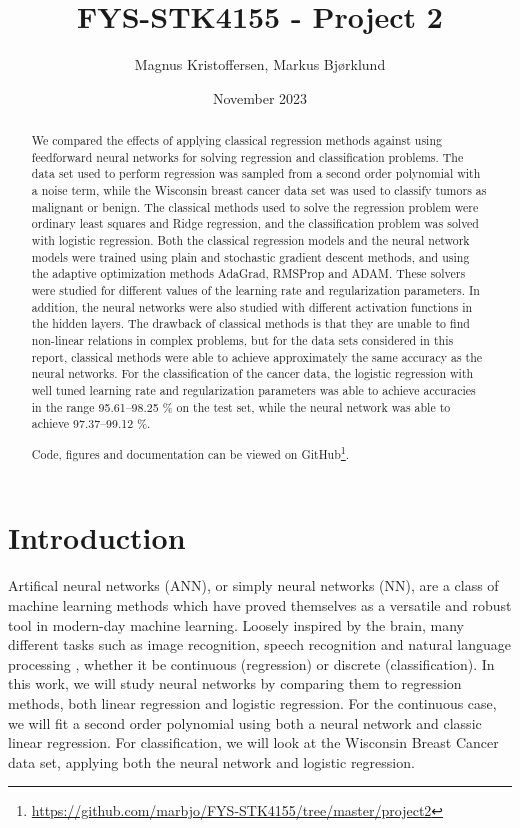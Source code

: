 \documentclass[12pt]{article}
\title{FYS-STK4155 - Project 2}
\author{Magnus Kristoffersen, Markus Bjørklund}
\date{November 2023}
\begin{document}
\maketitle

\begin{abstract}
We compared the effects of applying classical regression methods against using feedforward neural networks for solving regression and classification problems. The data set used to perform regression was sampled from a second order polynomial with a noise term, while the Wisconsin breast cancer data set was used to classify tumors as malignant or benign. The classical methods used to solve the regression problem were ordinary least squares and Ridge regression, and the classification problem was solved with logistic regression. Both the classical regression models and the neural network models were trained using plain and stochastic gradient descent methods, and using the adaptive optimization methods AdaGrad, RMSProp and ADAM. These solvers were studied for different values of the learning rate and regularization parameters. In addition, the neural networks were also studied with different activation functions in the hidden layers. The drawback of classical methods is that they are unable to find non-linear relations in complex problems, but for the data sets considered in this report, classical methods were able to achieve approximately the same accuracy as the neural networks. For the classification of the cancer data, the logistic regression with well tuned learning rate and regularization parameters was able to achieve accuracies in the range \numrange[range-phrase = --]{95.61}{98.25} \% on the test set, while the neural network was able to achieve \numrange[range-phrase = --]{97.37}{99.12} \%.

    
Code, figures and documentation can be viewed on GitHub\footnote{\url{https://github.com/marbjo/FYS-STK4155/tree/master/project2}}.
\end{abstract}

\section{Introduction}
Artifical neural networks (ANN), or simply neural networks (NN), are a class of machine learning methods which have proved themselves as a versatile and robust tool in modern-day machine learning. Loosely inspired by the brain, many different tasks such as image recognition, speech recognition and natural language processing \cite{Nielsen}, whether it be continuous (regression) or discrete (classification).
In this work, we will study neural networks by comparing them to regression methods, both linear regression and logistic regression. For the continuous case, we will fit a second order polynomial using both a neural network and classic linear regression. For classification, we will look at the Wisconsin Breast Cancer data set\cite{breast_cancer_wisconsin}, applying both the neural network and logistic regression.
\end{document}
